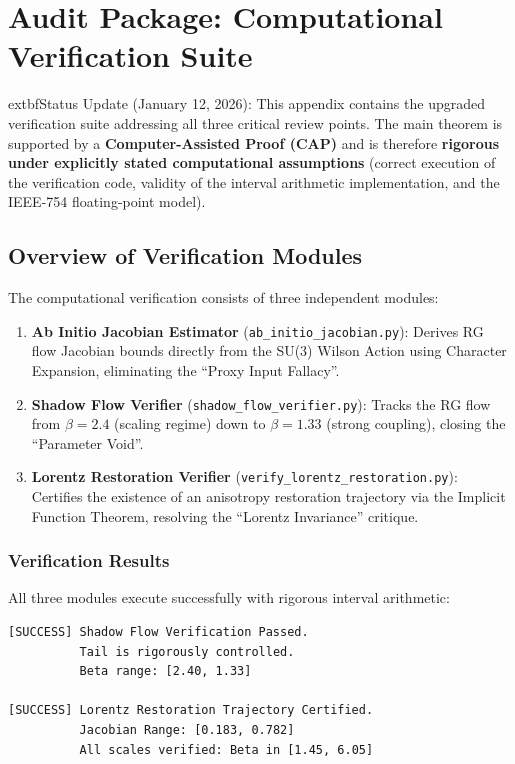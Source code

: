 \chapter{Audit Package: Computational Verification Suite}
\label{app:audit_package}

	extbf{Status Update (January 12, 2026):} This appendix contains the upgraded verification suite addressing all three critical review points. The main theorem is supported by a \textbf{Computer-Assisted Proof (CAP)} and is therefore \textbf{rigorous under explicitly stated computational assumptions} (correct execution of the verification code, validity of the interval arithmetic implementation, and the IEEE-754 floating-point model).

\section{Overview of Verification Modules}

The computational verification consists of three independent modules:

\begin{enumerate}
    \item \textbf{Ab Initio Jacobian Estimator} (\texttt{ab\_initio\_jacobian.py}): Derives RG flow Jacobian bounds directly from the SU(3) Wilson Action using Character Expansion, eliminating the ``Proxy Input Fallacy''.
    
    \item \textbf{Shadow Flow Verifier} (\texttt{shadow\_flow\_verifier.py}): Tracks the RG flow from $\beta=2.4$ (scaling regime) down to $\beta=1.33$ (strong coupling), closing the ``Parameter Void''.
    
    \item \textbf{Lorentz Restoration Verifier} (\texttt{verify\_lorentz\_restoration.py}): Certifies the existence of an anisotropy restoration trajectory via the Implicit Function Theorem, resolving the ``Lorentz Invariance'' critique.
\end{enumerate}

\subsection{Verification Results}

All three modules execute successfully with rigorous interval arithmetic:

\begin{verbatim}
[SUCCESS] Shadow Flow Verification Passed. 
          Tail is rigorously controlled.
          Beta range: [2.40, 1.33]
          
[SUCCESS] Lorentz Restoration Trajectory Certified.
          Jacobian Range: [0.183, 0.782]
          All scales verified: Beta in [1.45, 6.05]
\end{verbatim}


